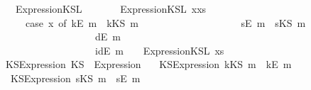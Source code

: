\begin{isabellebody}
\isanewline
\ \ \ {\isachardoublequoteopen}Expression{}KSL\ {\isacharbrackleft}{\isacharbrackright}\ {\isacharequal}\ {\isacharbrackleft}{\isacharbrackright}{\isachardoublequoteclose}\ {\isacharbar}\isanewline
\ \ \ {\isachardoublequoteopen}Expression{}KSL\ {\isacharparenleft}x{\isacharhash}xs{\isacharparenright}\ {\isacharequal}\ \isanewline
\ \ \ \ \ {\isacharparenleft}{\isacharparenleft}case\ x\ of\ {\isacharparenleft}kE\ m{\isacharparenright}\ {\isasymRightarrow}\ {\isacharbrackleft}kKS\ m{\isacharbrackright}\ \isanewline
\ \ \ \ \ \ \ \ \ \ \ \ \ \ \ \ \ \ {\isacharbar}\ {\isacharparenleft}sE\ m{\isacharparenright}\ {\isasymRightarrow}\ {\isacharbrackleft}sKS\ m{\isacharbrackright}\ \isanewline
\ \ \ \ \ \ \ \ \ \ \ \ \ \ \ \ \ \ {\isacharbar}\ {\isacharparenleft}dE\ m{\isacharparenright}\ {\isasymRightarrow}\ {\isacharbrackleft}{\isacharbrackright}\ \isanewline
\ \ \ \ \ \ \ \ \ \ \ \ \ \ \ \ \ \ {\isacharbar}\ {\isacharparenleft}idE\ m{\isacharparenright}\ {\isasymRightarrow}\ {\isacharbrackleft}{\isacharbrackright}{\isacharparenright}\ {\isacharat}\ Expression{}KSL\ xs{\isacharparenright}\ {\isachardoublequoteclose}\isanewline
\isanewline
{}\isamarkupfalse%
\ KS{}Expression{\isacharcolon}{\isacharcolon}\ {\isachardoublequoteopen}KS\ {\isasymRightarrow}\ Expression{\isachardoublequoteclose}\ \isanewline
{}\isanewline
\ \ {\isachardoublequoteopen}KS{}Expression\ {\isacharparenleft}kKS\ m{\isacharparenright}\ {\isacharequal}\ {\isacharparenleft}kE\ m{\isacharparenright}{\isachardoublequoteclose}\ \ {\isacharbar}\isanewline
\ \ {\isachardoublequoteopen}KS{}Expression\ {\isacharparenleft}sKS\ m{\isacharparenright}\ {\isacharequal}\ {\isacharparenleft}sE\ m{\isacharparenright}{\isachardoublequoteclose}\isanewline
%
\isadelimtheory
\isanewline
%
\endisadelimtheory
%
\isatagtheory
{}\isamarkupfalse%
%
\endisatagtheory
{\isafoldtheory}%
%
\isadelimtheory
%
\endisadelimtheory
\end{isabellebody}%
